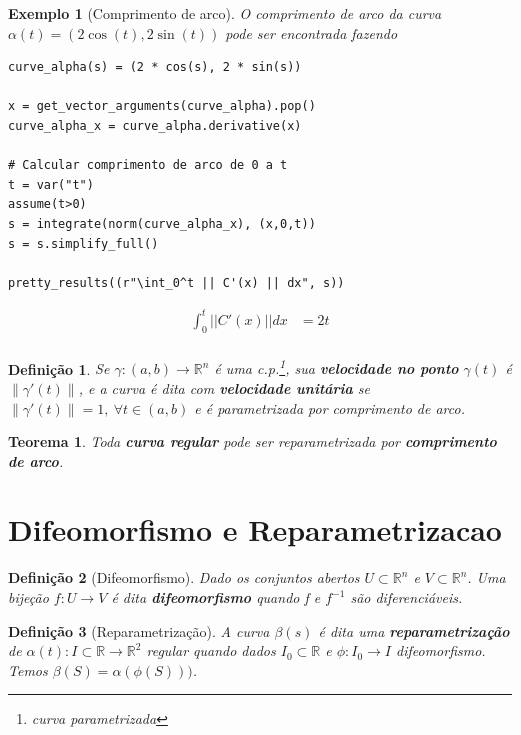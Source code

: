 \documentclass[12pt]{article}
\newtheorem{ex}{Exemplo}[section]
\newtheorem{theorem}{Teorema}
\newtheorem{definition}{Definição}
\begin{document}
\begin{ex}[Comprimento de arco] O comprimento de arco da curva $\alpha(t) = (2 \cos(t), 2 \sin(t))$ pode ser encontrada fazendo
\begin{lstlisting}
curve_alpha(s) = (2 * cos(s), 2 * sin(s))

x = get_vector_arguments(curve_alpha).pop()
curve_alpha_x = curve_alpha.derivative(x)
    
# Calcular comprimento de arco de 0 a t
t = var("t")
assume(t>0)
s = integrate(norm(curve_alpha_x), (x,0,t))
s = s.simplify_full()

pretty_results((r"\int_0^t || C'(x) || dx", s))
\end{lstlisting}

\newcommand{\Bold}[1]{\mathbf{#1}}\begin{align*} \int_0^t || C'(x) || dx &= 2t \\ \end{align*}
\end{ex}

\begin{definition}
Se $\gamma: (a, b) \rightarrow \mathbb{R}^n$ é uma c.p.\footnote{curva parametrizada}, sua \textbf{velocidade no ponto} $\gamma(t)$ é $\| \gamma'(t) \|$, e a curva é dita com \textbf{velocidade unitária} se $\| \gamma'(t) \| = 1,\ \forall t \in (a, b)$ e é parametrizada por comprimento de arco.
\end{definition}

\begin{theorem}
Toda \textbf{curva regular} pode ser reparametrizada por \textbf{comprimento de arco}.
\end{theorem}


\section{Difeomorfismo e Reparametrizacao}\label{s3}
\begin{definition}[Difeomorfismo]
Dado os conjuntos abertos $U \subset \mathbb{R}^n$ e $V \subset \mathbb{R}^n$. Uma bijeção $f: U \rightarrow V$ é dita \textbf{difeomorfismo} quando f e $f^{-1}$ são diferenciáveis.
\end{definition}

\begin{definition}[Reparametrização]
A curva $\beta(s)$ é dita uma \textbf{reparametrização} de $\alpha(t): I \subset \mathbb{R} \rightarrow \mathbb{R}^2$ regular quando dados $I_0 \subset \mathbb{R}$ e $\phi: I_0 \rightarrow I$ difeomorfismo. Temos $\beta(S) = \alpha(\phi(S)))$.
\end{definition}
\end{document}
